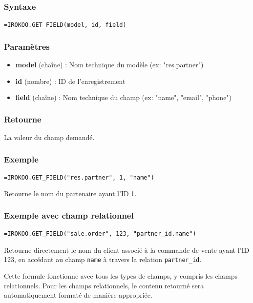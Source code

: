 \documentclass[12pt, a4paper]{article}
\begin{document}
\subsubsection{Syntaxe}
\begin{lstlisting}
=IROKOO.GET_FIELD(model, id, field)
\end{lstlisting}

\subsubsection{Paramètres}
\begin{itemize}
    \item \textbf{model} (chaîne) : Nom technique du modèle (ex: "res.partner")
    \item \textbf{id} (nombre) : ID de l'enregistrement
    \item \textbf{field} (chaîne) : Nom technique du champ (ex: "name", "email", "phone")
\end{itemize}

\subsubsection{Retourne}
La valeur du champ demandé.

\subsubsection{Exemple}
\begin{lstlisting}
=IROKOO.GET_FIELD("res.partner", 1, "name")
\end{lstlisting}
Retourne le nom du partenaire ayant l'ID 1.

\subsubsection{Exemple avec champ relationnel}
\begin{lstlisting}
=IROKOO.GET_FIELD("sale.order", 123, "partner_id.name")
\end{lstlisting}
Retourne directement le nom du client associé à la commande de vente ayant l'ID 123, en accédant au champ \texttt{name} à travers la relation \texttt{partner\_id}.

\begin{tip}
Cette formule fonctionne avec tous les types de champs, y compris les champs relationnels. Pour les champs relationnels, le contenu retourné sera automatiquement formaté de manière appropriée.
\end{tip}
\end{document}
